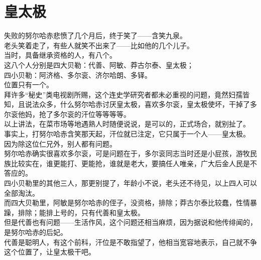 \section{皇太极}
\ifnum{}
	\begin{multicols}{\theparacolNo}
\fi
失败的努尔哈赤悲愤了几个月后，终于笑了——含笑九泉。\\

老头笑着走了，有些人就笑不出来了——比如他的几个儿子。\\

当时，具备继承资格的人，有八个。\\

这八个人分别是四大贝勒：代善、阿敏、莽古尔泰、皇太极；\\

四小贝勒：阿济格、多尔衮、济尔哈朗、多铎。\\

位置只有一个。\\

拜许多“秘史”类电视剧所赐，这个连史学研究者都未必重视的问题，竟然妇孺皆知，且说法众多，什么努尔哈赤讨厌皇太极，喜欢多尔衮，皇太极使坏，干掉了多尔衮他妈，抢了多尔衮的汗位等等等等。\\

以上讲法，在菜市场等地遇熟人时随便说说，是可以的，正式场合，就别扯了。\\

事实上，打努尔哈赤含笑那天起，汗位就已注定，它只属于一个人——皇太极。\\

因为除这位仁兄外，别人都有问题。\\

努尔哈赤确实很喜欢多尔衮，可是问题在于，多尔衮同志当时还是小屁孩，游牧民族比较实在，谁更能打、更能抢，谁就是老大，要搞任人唯亲，广大后金人民是不答应的。\\

四小贝勒里的其他三人，那更别提了，年龄小不说，老头还不待见，以上四人可以全部淘汰。\\

而四大贝勒里，阿敏是努尔哈赤的侄子，没资格，排除；莽古尔泰比较蠢，性情暴躁，排除；能排上号的，只有代善和皇太极。\\

但是代善也有问题——生活作风，这个问题还相当麻烦，因为据说和他传绯闻的，是努尔哈赤的后妃。\\

代善是聪明人，有这个前科，汗位是不敢指望了，他相当宽容地表示，自己就不争这个位置了，让皇太极干吧。\\


\end{multicols}
